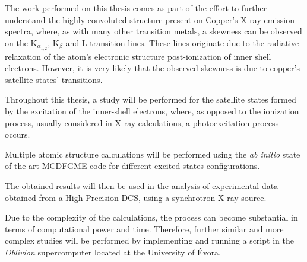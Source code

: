 

%

The work performed on this thesis comes as part of the effort to further understand the highly convoluted structure present on Copper's X-ray emission spectra, where, as with many other transition metals, a skewness can be observed on the K$_{\alpha_{1,2}}$, K$_{\beta}$ and L transition lines. These lines originate due to the radiative relaxation of the atom's electronic structure post-ionization of inner shell electrons.
However, it is very likely that the observed skewness is due to copper's satellite states' transitions.

Throughout this thesis, a study will be performed for the satellite states formed by the excitation of the inner-shell electrons, where, as opposed to the ionization process, usually considered in X-ray calculations, a photoexcitation process occurs.

 Multiple atomic structure calculations will be performed using the \textit{ab initio} state of the art \gls{MCDFGME} code for different excited states configurations.

 The obtained results will then be used in the analysis of experimental data obtained from a High-Precision \gls{DCS}, using a synchrotron X-ray source.

Due to the complexity of the calculations, the process can become substantial in terms of computational power and time. Therefore, further similar and more complex studies will be performed by implementing and running a script in the \textit{Oblivion} supercomputer located at the University of Évora.

